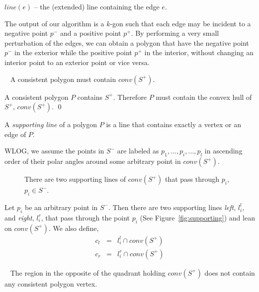 \documentclass[fullpage,my,12pt]{article}
\begin{document}
$line(e)$ -- the (extended) line containing the edge $e$.

The output of our algorithm is a $k$-gon such that each edge may
be incident to a negative point $p^-$ and a positive point $p^+$.
By performing a very small perturbation of the edges, we can
obtain a polygon that have the negative point $p^-$ in the
exterior while the positive point $p^+$ in the interior, without
changing an interior point to an exterior point or vice versa.

\begin{observation}~\label{obv:enclose}
A consistent polygon must contain $conv(S^+)$.
\end{observation}
\pf
A consistent polygon $P$ contains $S^+$. Therefore $P$ must contain the
convex hull of $S^+$, $conv(S^+)$.
\qed

A {\em supporting line} of a polygon $P$ is a line that contains
exactly a vertex or an edge of $P$.

WLOG, we assume the points in $S^-$ are labeled as $p_1, \ldots,
p_i, \ldots, p_l$ in ascending order of their polar angles around
some arbitrary point in $conv(S^+)$.


\begin{figure}
\begin{center}

\end{center}
\caption{There are two supporting lines
of $conv(S^+)$ that pass through $p_i$,
$p_i \in S^-$.}
\label{supporting}
\end{figure}

Let $p_i$ be an arbitrary point in $S^-$. Then there
are two supporting lines {\em left}, $l_i^l$, and {\em right}, $l_i^r$,
that pass through the point $p_i$ (See Figure~\ref{fig:supporting})
and lean on $conv(S^+)$. We also define,
\begin{eqnarray*}
c_l &=& l_i^l \cap conv(S^+)\\
c_r &=& l_i^r \cap conv(S^+)
\end{eqnarray*}
   
\begin{lemma}~\label{lem:supporting}
The region in the opposite of the quadrant holding $conv(S^+)$
does not contain any consistent polygon vertex.
\end{lemma}
\end{document}
